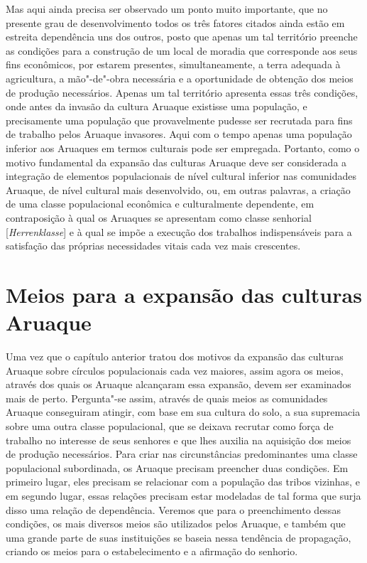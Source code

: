 Mas aqui ainda precisa ser observado um ponto muito importante, que no
presente grau de desenvolvimento todos os três fatores citados ainda
estão em estreita dependência uns dos outros, posto que apenas um tal
território preenche as condições para a construção de um local de
moradia que corresponde aos seus fins econômicos, por estarem presentes,
simultaneamente, a terra adequada à agricultura, a mão"-de"-obra
necessária e a oportunidade de obtenção dos meios de produção
necessários. Apenas um tal território apresenta essas três condições,
onde antes da invasão da cultura Aruaque existisse uma população, e
precisamente uma população que provavelmente pudesse ser recrutada para
fins de trabalho pelos Aruaque invasores. Aqui com o tempo apenas uma
população inferior aos Aruaques em termos culturais pode ser empregada.
Portanto, como o motivo fundamental da expansão das culturas Aruaque
deve ser considerada a integração de elementos populacionais de nível
cultural inferior nas comunidades Aruaque, de nível cultural mais
desenvolvido, ou, em outras palavras, a criação de uma classe
populacional econômica e culturalmente dependente, em contraposição à
qual os Aruaques se apresentam como classe senhorial
{[}\emph{Herrenklasse}{]} e à qual se impõe a execução dos trabalhos
indispensáveis para a satisfação das próprias necessidades vitais cada
vez mais crescentes.


\chapter{Meios para a expansão das culturas Aruaque}

Uma vez que o capítulo anterior tratou dos motivos da expansão das
culturas Aruaque sobre círculos populacionais cada vez maiores, assim
agora os meios, através dos quais os Aruaque alcançaram essa expansão,
devem ser examinados mais de perto. Pergunta"-se assim, através de quais
meios as comunidades Aruaque conseguiram atingir, com base em sua
cultura do solo, a sua supremacia sobre uma outra classe populacional,
que se deixava recrutar como força de trabalho no interesse de seus
senhores e que lhes auxilia na aquisição dos meios de produção
necessários. Para criar nas circunstâncias predominantes uma classe
populacional subordinada, os Aruaque precisam preencher duas condições.
Em primeiro lugar, eles precisam se relacionar com a população das
tribos vizinhas, e em segundo lugar, essas relações precisam estar
modeladas de tal forma que surja disso uma relação de dependência.
Veremos que para o preenchimento dessas condições, os mais diversos
meios são utilizados pelos Aruaque, e também que uma grande parte de
suas instituições se baseia nessa tendência de propagação, criando os
meios para o estabelecimento e a afirmação do senhorio.

